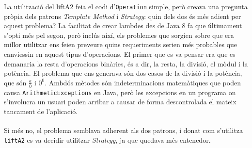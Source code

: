 
	La utilització del liftA2 feia el codi d'\texttt{Operation} simple, però creava una pregunta pròpia dels patrons
	\textit{Template Method} i \textit{Strategy}: quin dels dos és més adient per aquest problema?
	 La facilitat de crear lambdes des de Java 8 fa que últimament s'opti més pel segon, però inclús així, els problemes
	 que sorgien sobre que era millor utilitzar ens feien preveure quins requeriments serien més probables 
	 que canviessin en aquest tipus d'operacions. El primer que es va pensar era que 
	 es demanaria la resta d'operacions binàries, és a dir, la resta, la divisió, el mòdul i 
	 la potència. El problema que ens generava són dos casos de la divisió i la potència, 
	 que són $\frac{a}{0}$ i $0^0$. Ambdós mètodes són indeterminacions matemàtiques que poden causa 
	 \texttt{ArithmeticExceptions} en Java, però les excepcions en un programa on s'involucra un usuari poden arribar a causar
	 de forma descontrolada el mateix tancament de l'aplicació.\\
	 \\
	 Si més  no, el problema semblava adherent als dos patrons, i donat com s'utilitza \texttt{liftA2} es va decidir utilitzar
	 \textit{Strategy},  ja que quedava més entenedor.
